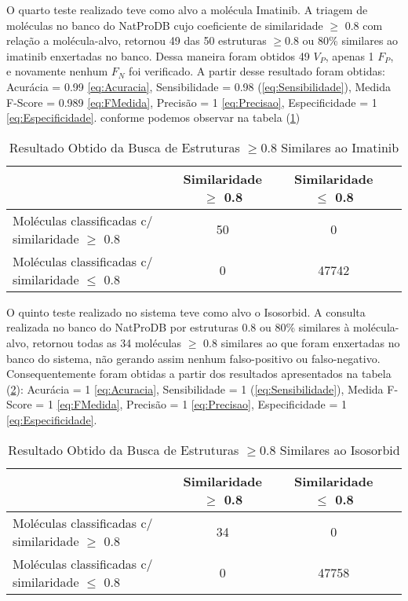 O quarto teste realizado teve como alvo a molécula Imatinib. A triagem de moléculas no banco do NatProDB cujo coeficiente de similaridade $\geq$ 0.8 com relação a molécula-alvo, retornou 49 das 50 estruturas $\geq$0.8 ou 80\% similares ao imatinib enxertadas no banco. Dessa maneira foram obtidos 49  $V_P$, apenas 1 $F_P$, e novamente nenhum $F_N$ foi verificado. A partir desse resultado foram obtidas: Acurácia = 0.99 \eqref{eq:Acuracia}, Sensibilidade = 0.98 (\ref{eq:Sensibilidade}), Medida F-Score = 0.989 \eqref{eq:FMedida}, Precisão = 1 \eqref{eq:Precisao},  Especificidade = 1 \eqref{eq:Especificidade}. conforme podemos observar na tabela (\ref{tab:Imatinib})

 \begin{table}[!htb]
	\centering
	\footnotesize
	\caption[Resultado Obtido da Busca de Estruturas $\geq$0.8 Similares ao Imatinib]{Resultado Obtido da Busca de Estruturas $\geq$0.8 Similares ao Imatinib}
	\label{tab:Imatinib}	
	\begin{tabular}{p{4cm}ccc}
		\hline \SPACE
		\textbf{}&\textbf{Similaridade $\geq $ 0.8} & \textbf{Similaridade $\leq $ 0.8} \\ \hline \SPACE
	Moléculas classificadas c/ similaridade $\geq $ 0.8  &	50 & 0 \\ \hline \SPACE
	Moléculas classificadas c/ similaridade $\leq $ 0.8  & 0 & 47742\\ \hline 
	\end{tabular}
\end{table}

O quinto teste realizado no sistema teve como alvo o Isosorbid. A consulta realizada no banco do NatProDB por estruturas 0.8 ou 80\% similares à molécula-alvo, retornou todas as 34 moléculas $\geq$ 0.8 similares ao que foram enxertadas no banco do sistema, não gerando assim nenhum falso-positivo ou falso-negativo. Consequentemente foram obtidas a partir dos resultados apresentados na tabela (\ref{tab:Isosorbid}): Acurácia = 1 \eqref{eq:Acuracia}, Sensibilidade = 1 (\ref{eq:Sensibilidade}), Medida F-Score = 1 \eqref{eq:FMedida}, Precisão = 1 \eqref{eq:Precisao},  Especificidade = 1 \eqref{eq:Especificidade}.

 \begin{table}[!htb]
	\centering
	\footnotesize
	\caption[Resultado Obtido da Busca de Estruturas $\geq$0.8 Similares ao Isosorbid]{Resultado Obtido da Busca de Estruturas $\geq$0.8 Similares ao Isosorbid}
	\label{tab:Isosorbid}	
	\begin{tabular}{p{4cm}ccc}
		\hline \SPACE
		\textbf{}&\textbf{Similaridade $\geq $ 0.8} & \textbf{Similaridade $\leq $ 0.8} \\ \hline \SPACE
	Moléculas classificadas c/ similaridade $\geq $ 0.8  &	34 & 0 \\ \hline \SPACE
	Moléculas classificadas c/ similaridade $\leq $ 0.8  & 0 & 47758\\ \hline 
	\end{tabular}
\end{table}


